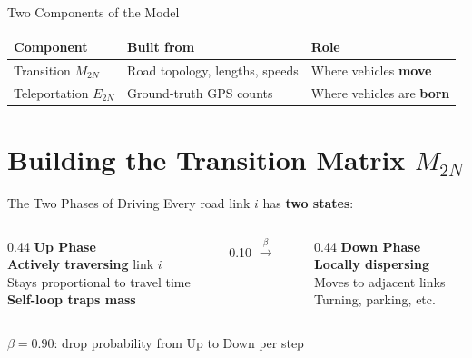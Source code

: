 \documentclass[aspectratio=169,12pt]{beamer}
\newcommand{\highlight}[1]{\textcolor{accent}{\textbf{#1}}}
\newcommand{\good}[1]{\textcolor{good}{\textbf{#1}}}
\begin{document}
\begin{frame}{Two Components of the Model}
  \centering

  \medskip
  \small
  \begin{tabular}{lll}
    \toprule
    \textbf{Component} & \textbf{Built from} & \textbf{Role}\\
    \midrule
    Transition $M_{2N}$ & Road topology, lengths, speeds
      & Where vehicles \textbf{move}\\
    Teleportation $E_{2N}$ & Ground-truth GPS counts
      & Where vehicles are \textbf{born}\\
    \bottomrule
  \end{tabular}
\end{frame}

\section{Building the Transition Matrix $M_{2N}$}

\begin{frame}{The Two Phases of Driving}
  Every road link $i$ has \highlight{two states}:

  \medskip
  \begin{columns}[c]
    \begin{column}{0.44\textwidth}
      \centering
      \textbf{Up Phase}\\[4pt]
      \highlight{Actively traversing} link $i$\\[3pt]
      Stays proportional to travel time\\[3pt]
      \good{Self-loop traps mass}
    \end{column}
    \begin{column}{0.10\textwidth}
      \centering
      {\Large$\xrightarrow{\;\beta\;}$}
    \end{column}
    \begin{column}{0.44\textwidth}
      \centering
      \textbf{Down Phase}\\[4pt]
      \highlight{Locally dispersing}\\[3pt]
      Moves to adjacent links\\[3pt]
      Turning, parking, etc.
    \end{column}
  \end{columns}

  \medskip
  \centering
  $\beta = 0.90$: drop probability from Up to Down per step
\end{frame}
\end{document}
